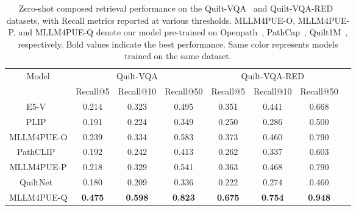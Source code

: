 \begin{table*}[h!]
\small
\centering
\begin{tabular}{cccccccc}
\hline
\multirow{2}{*}{Model} & \multicolumn{3}{c}{Quilt-VQA~\cite{seyfioglu2024quilt}} & \multicolumn{3}{c}{Quilt-VQA-RED~\cite{seyfioglu2024quilt}} \\ 
& Recall@5 &Recall@10 & Recall@50 & Recall@5 & Recall@10 & Recall@50\\
\hline
E5-V~\cite{jiang2024e5} & 0.214 & 0.323 & 0.495 & 0.351 & 0.441 & 0.668\\ 
\rowcolor{trainA}PLIP~\cite{huang2023visual} & 0.191 & 0.224 & 0.349 & 0.250 & 0.286 & 0.500\\ 
\rowcolor{trainA}MLLM4PUE-O & 0.239 & 0.334 & 0.583 & 0.373 & 0.460 & 0.790\\ 
\rowcolor{trainB}PathCLIP~\cite{ikezogwo2024quilt} & 0.192 & 0.242 & 0.413 & 0.262 & 0.337 & 0.603\\ 
\rowcolor{trainB}MLLM4PUE-P & 0.218 & 0.329 & 0.541 & 0.363 & 0.468 & 0.790\\ 
\rowcolor{trainC}QuiltNet~\cite{ikezogwo2024quilt} & 0.180 & 0.209 & 0.336 & 0.222 & 0.274 & 0.460\\ 
\rowcolor{trainC}MLLM4PUE-Q & \textbf{0.475} & \textbf{0.598} & \textbf{0.823} & \textbf{0.675} & \textbf{0.754} & \textbf{0.948}\\ 
\hline
\end{tabular}
\caption{Zero-shot composed retrieval performance on the Quilt-VQA~\cite{seyfioglu2024quilt} and Quilt-VQA-RED~\cite{seyfioglu2024quilt} datasets, with Recall metrics reported at various thresholds. MLLM4PUE-O, MLLM4PUE-P, and MLLM4PUE-Q denote our model pre-trained on Openpath~\cite{huang2023visual}, PathCap~\cite{sun2024pathasst},  Quilt1M~\cite{ikezogwo2024quilt}, respectively. Bold values indicate the best performance. Same color represents models trained on the same dataset.}
\label{t4}
\vspace{-2ex}
\end{table*}


